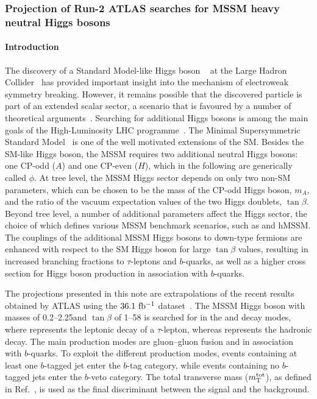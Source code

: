 \subsubsection{Projection of Run-2 ATLAS searches for MSSM heavy neutral Higgs bosons}
\paragraph{Introduction}

The discovery of a Standard Model-like Higgs boson ~\cite{ATLASHiggsJuly2012, CMSHiggsJuly2012}
at the Large Hadron Collider~\cite{LHC} has provided important insight into the mechanism of
electroweak symmetry breaking. However, it remains possible that the discovered particle is part
of an extended scalar sector, a scenario that is favoured by a number of theoretical arguments~\cite{Djouadi:2005gj,Branco:2011iw}.
Searching for additional Higgs bosons is among the main goals of
the High-Luminosity LHC programme~\cite{ecfa15}. The Minimal Supersymmetric Standard
Model~\cite{Djouadi:2005gj,Fayet:1976et,Fayet:1977yc} is one of the well motivated extensions
of the SM\@. Besides the SM-like Higgs boson, the MSSM requires two additional neutral Higgs bosons:
one CP-odd ($A$) and one CP-even ($H$), which in the following are generically called $\phi$.
At tree level, the MSSM Higgs sector depends on only two non-SM parameters, which can be chosen
to be the mass of the CP-odd Higgs boson, $m_A$, and the ratio of the vacuum expectation values
of the two Higgs doublets, $\tan\beta$. Beyond tree level, a number of additional parameters
affect the Higgs sector, the choice of which defines various MSSM benchmark scenarios, such as \mhmodp and hMSSM.
The couplings of the additional MSSM Higgs bosons to down-type fermions are enhanced with respect to
the SM Higgs boson for large $\tan\beta$ values, resulting in increased branching fractions to
$\tau$-leptons and $b$-quarks, as well as a higher cross section for Higgs boson production
in association with $b$-quarks.

The projections presented in this note are extrapolations of the recent results obtained by ATLAS using
the $36.1~\mbox{fb$^{-1}$}$ \RunTwo dataset~\cite{ATLASRun2Ditau}.  The MSSM Higgs boson with masses of
0.2--2.25\TeV and $\tan\beta$ of 1--58 is searched for in the \lephad and \hadhad decay modes,
where \taulep represents the leptonic decay of a $\tau$-lepton, whereas \tauhad represents the hadronic decay.
The main production modes are gluon--gluon fusion and in association with $b$-quarks.
To exploit the different production modes, events containing at least one $b$-tagged jet enter the $b$-tag
category, while events containing no $b$-tagged jets enter the $b$-veto category. The total transverse
mass ($m_\textnormal{T}^\textnormal{tot}$), as defined in Ref.~\cite{ATLASRun2Ditau}, is used as the final discriminant between
the signal and the background.

